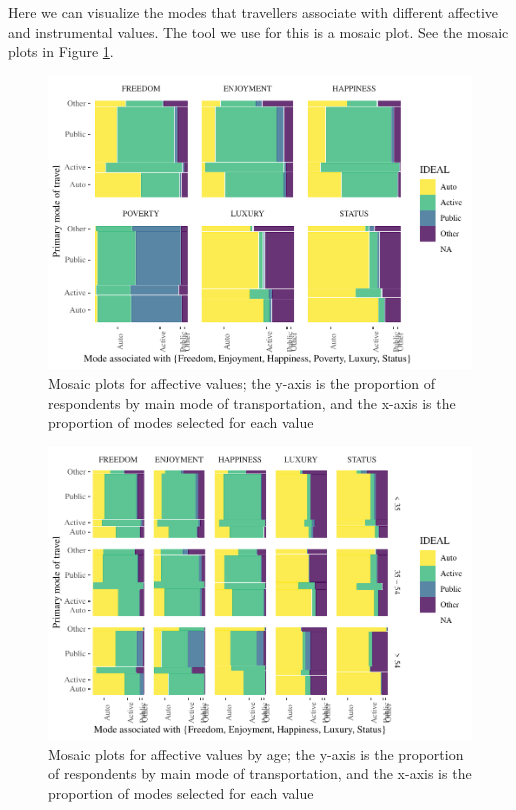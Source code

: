 \documentclass[]{elsarticle} %
\makeatletter
\def\maxwidth{\ifdim\Gin@nat@width>\linewidth\linewidth
\else\Gin@nat@width\fi}
\let\Oldincludegraphics\includegraphics
\renewcommand{\includegraphics}[1]{\Oldincludegraphics[width=\maxwidth]{#1}}
\makeatother
\begin{document}
Here we can visualize the modes that travellers associate with different
affective and instrumental values. The tool we use for this is a mosaic
plot. See the mosaic plots in Figure
\ref{fig:mosaic-plots-by-attribute}.

\begin{figure}
\centering
\includegraphics{Dissonance_Santiago_v1_files/figure-latex/figure-mosaic-plots-by-attribute-without-instrumental-1.pdf}
\caption{\label{fig:mosaic-plots-by-attribute}Mosaic plots for affective
values; the y-axis is the proportion of respondents by main mode of
transportation, and the x-axis is the proportion of modes selected for
each value}
\end{figure}

\begin{figure}
\centering
\includegraphics{Dissonance_Santiago_v1_files/figure-latex/figure-mosaic-plots-by-attribute-and-age-without-instrumental-1.pdf}
\caption{\label{fig:mosaic-plots-by-age}Mosaic plots for affective
values by age; the y-axis is the proportion of respondents by main mode
of transportation, and the x-axis is the proportion of modes selected
for each value}
\end{figure}
\end{document}
